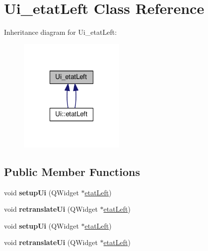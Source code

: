 \hypertarget{class_ui__etat_left}{\section{Ui\-\_\-etat\-Left Class Reference}
\label{class_ui__etat_left}
}


Inheritance diagram for Ui\-\_\-etat\-Left\-:
\nopagebreak
\begin{figure}[H]
\begin{center}
\leavevmode
\includegraphics[width=144pt]{class_ui__etat_left__inherit__graph}
\end{center}
\end{figure}
\subsection*{Public Member Functions}
\begin{DoxyCompactItemize}
\item 
\hypertarget{class_ui__etat_left_a6ced76468569bc7b60f2f007c535091b}{void {\bfseries setup\-Ui} (Q\-Widget $\ast$\hyperlink{classetat_left}{etat\-Left})}\label{class_ui__etat_left_a6ced76468569bc7b60f2f007c535091b}

\item 
\hypertarget{class_ui__etat_left_a8a2d38afa659c1af5db423e286b41eda}{void {\bfseries retranslate\-Ui} (Q\-Widget $\ast$\hyperlink{classetat_left}{etat\-Left})}\label{class_ui__etat_left_a8a2d38afa659c1af5db423e286b41eda}

\item 
\hypertarget{class_ui__etat_left_a6ced76468569bc7b60f2f007c535091b}{void {\bfseries setup\-Ui} (Q\-Widget $\ast$\hyperlink{classetat_left}{etat\-Left})}\label{class_ui__etat_left_a6ced76468569bc7b60f2f007c535091b}

\item 
\hypertarget{class_ui__etat_left_a8a2d38afa659c1af5db423e286b41eda}{void {\bfseries retranslate\-Ui} (Q\-Widget $\ast$\hyperlink{classetat_left}{etat\-Left})}\label{class_ui__etat_left_a8a2d38afa659c1af5db423e286b41eda}

\end{DoxyCompactItemize}
